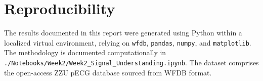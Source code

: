\documentclass[11pt, a4paper]{article}
\begin{document}
\section{Reproducibility}
The results documented in this report were generated using Python within a localized virtual environment, relying on \texttt{wfdb}, \texttt{pandas}, \texttt{numpy}, and \texttt{matplotlib}. The methodology is documented computationally in \texttt{./Notebooks/Week2/Week2\_Signal\_Understanding.ipynb}. The dataset comprises the open-access ZZU pECG database \cite{Tan2025} sourced from WFDB format.



\end{document}
